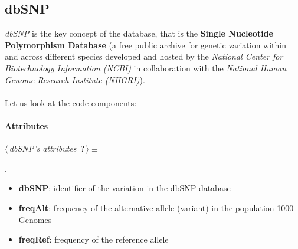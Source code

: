 \subsection{dbSNP}
\emph{dbSNP} is the key concept of the database, that is the \textbf{Single Nucleotide Polymorphism Database} (a free public archive for genetic variation within and across different species developed and hosted by the \emph{National Center for Biotechnology Information (NCBI)} in collaboration with the \emph{National Human Genome Research Institute (NHGRI)}).
\\
\\Let us look at the code components:

\newpage

\paragraph{Attributes}      

	\begin{flushleft} \small
\begin{minipage}{\linewidth}\label{scrap4}\raggedright\small
{} $\langle\,${\itshape {dbSNP's attributes}}\nobreak\ {\footnotesize {?}}$\,\rangle\equiv$
\vspace{-1ex}
\begin{list}{}{} \item

                
        {\NWsep}
\end{list}
\vspace{-1.5ex}
\footnotesize
\begin{list}{}{\setlength{\itemsep}{-\parsep}\setlength{\itemindent}{-\leftmargin}}
\item {\NWtxtMacroNoRef}.

\item{}
\end{list}
\end{minipage}\vspace{4ex}
\end{flushleft}
\begin{itemize}
 	\item \textbf{dbSNP}: identifier of the variation in the dbSNP database
 	\item \textbf{freqAlt}: frequency of the alternative allele (variant) in the population 1000 Genomes
 	\item \textbf{freqRef}: frequency of the reference allele
\end{itemize}

